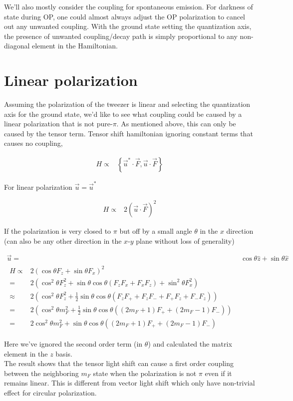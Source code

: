 \documentclass[10pt,fleqn]{article}
\newcommand{\eqar}[1]
{
  \begin{align}
    #1
  \end{align}
}
\newcommand{\paren}[1]{{\left({#1}\right)}}
\newcommand{\crly}[1]{{\left\{{#1}\right\}}}
\begin{document}
We'll also mostly consider the coupling for spontaneous emission.
For darkness of state during OP, one could almost always adjust the OP polarization
to cancel out any unwanted coupling. With the ground state
setting the quantization axis, the presence of unwanted coupling/decay path
is simply proportional to any non-diagonal element in the Hamiltonian.\\

\section{Linear polarization}
\label{lin-pol}

Assuming the polarization of the tweezer is linear and selecting the quantization axis
for the ground state, we'd like to see what coupling could be
caused by a linear polarization that is not pure-$\pi$. As mentioned above,
this can only be caused by the tensor term.
Tensor shift hamiltonian ignoring constant terms that causes no coupling,
\eqar{
  H\propto&\crly{\vec{u}^*\cdot\vec F,\vec{u}\cdot\vec F}
}

For linear polarization $\vec{u}=\vec{u}^*$
\eqar{
  H\propto&2\paren{\vec{u}\cdot\vec F}^2
}

If the polarization is very closed to $\pi$ but off by a small angle $\theta$
in the $x$ direction (can also be any other direction in the $x$-$y$ plane
without loss of generality)
\eqar{
  \vec{u}=&\cos\theta \hat z + \sin\theta \hat x\\
  \begin{split}
    H\propto&2\paren{\cos\theta F_z+\sin\theta F_x}^2\\
    =&2\paren{\cos^2\theta F_z^2+\sin\theta\cos\theta\paren{F_zF_x+F_xF_z}+\sin^2\theta F_x^2}\\
    \approx&2\paren{\cos^2\theta F_z^2+\frac{1}{2}\sin\theta\cos\theta\paren{F_zF_++F_zF_-+F_+F_z+F_-F_z}}\\
    =&2\paren{\cos^2\theta m_F^2+\frac{1}{2}\sin\theta\cos\theta\paren{\paren{2m_F+1}F_++\paren{2m_F-1}F_-}}\\
    =&2\cos^2\theta m_F^2+\sin\theta\cos\theta\paren{\paren{2m_F+1}F_++\paren{2m_F-1}F_-}
  \end{split}
}
Here we've ignored the second order term (in $\theta$)
and calculated the matrix element in the $z$ basis.\\

The result shows that the tensor light shift can cause a first order coupling between
the neighboring $m_F$ state when the polarization is not $\pi$
even if it remains linear. This is different from vector light shift
which only have non-trivial effect for circular polarization.\\
\end{document}
